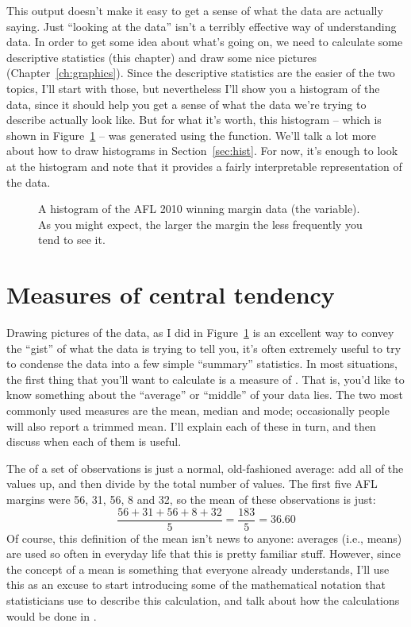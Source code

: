 This output doesn't make it easy to get a sense of what the data are actually saying. Just ``looking at the data'' isn't a terribly effective way of understanding data. In order to get some idea about what's going on, we need to calculate some descriptive statistics (this chapter) and draw some nice pictures (Chapter~\ref{ch:graphics}). Since the descriptive statistics are the easier of the two topics, I'll start with those, but nevertheless I'll show you a histogram of the  data, since it should help you get a sense of what the data we're trying to describe actually look like. But for what it's worth, this histogram -- which is shown in Figure~\ref{fig:histogram1} -- was generated using the  function. We'll talk a lot more about how to draw histograms in Section~\ref{sec:hist}. For now, it's enough to look at the histogram and note that it provides a fairly interpretable representation of the  data.

\begin{figure}[t]
\begin{center}
\caption{A histogram of the AFL 2010 winning margin data (the  variable). As you might expect, the larger the margin the less frequently you tend to see it.}
\label{fig:histogram1}
\HR
\end{center}
\end{figure}


\section{Measures of central tendency~\label{sec:centraltendency}}

Drawing pictures of the data, as I did in Figure~\ref{fig:histogram1} is an excellent way to convey the ``gist'' of what the data is trying to tell you, it's often extremely useful to try to condense the data into a few simple ``summary'' statistics. In most situations, the first thing that you'll want to calculate is a measure of . That is, you'd like to know something about the ``average'' or ``middle'' of your data lies. The two most commonly used measures are the mean, median and mode; occasionally people will also report a trimmed mean. I'll explain each of these in turn, and then discuss when each of them is useful.


The  of a set of observations is just a normal, old-fashioned average: add all of the values up, and then divide by the total number of values. The first five AFL margins were 56, 31, 56, 8 and 32, so the mean of these observations is just:
$$
\frac{56 + 31 + 56 + 8 + 32}{5} = \frac{183}{5} = 36.60
$$
Of course, this definition of the mean isn't news to anyone: averages (i.e., means) are used so often in everyday life that this is pretty familiar stuff. However, since the concept of a mean is something that everyone already understands, I'll use this as an excuse to start introducing some of the mathematical notation that statisticians use to describe this calculation, and talk about how the calculations would be done in \R. 

